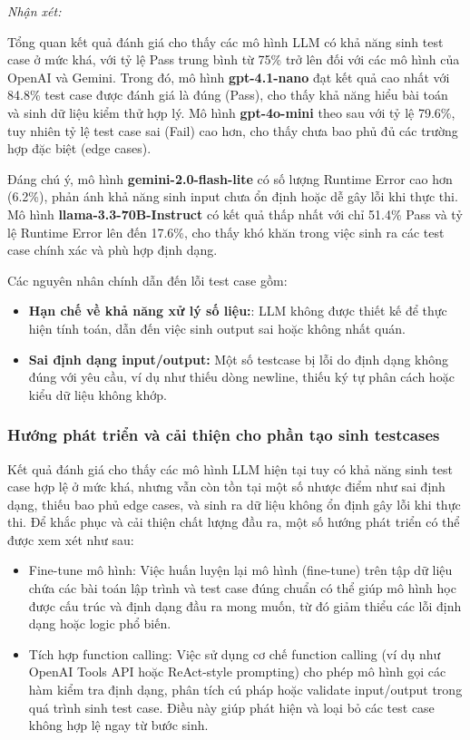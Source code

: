 \emph{Nhận xét: }

Tổng quan kết quả đánh giá cho thấy các mô hình LLM có khả năng sinh test case ở mức khá, với tỷ lệ Pass trung bình từ 75\% trở lên đối với các mô hình của OpenAI và Gemini. Trong đó, mô hình \textbf{gpt-4.1-nano} đạt kết quả cao nhất với 84.8\% test case được đánh giá là đúng (Pass), cho thấy khả năng hiểu bài toán và sinh dữ liệu kiểm thử hợp lý. Mô hình \textbf{gpt-4o-mini} theo sau với tỷ lệ 79.6\%, tuy nhiên tỷ lệ test case sai (Fail) cao hơn, cho thấy chưa bao phủ đủ các trường hợp đặc biệt (edge cases).

Đáng chú ý, mô hình \textbf{gemini-2.0-flash-lite} có số lượng Runtime Error cao hơn (6.2\%), phản ánh khả năng sinh input chưa ổn định hoặc dễ gây lỗi khi thực thi. Mô hình \textbf{llama-3.3-70B-Instruct} có kết quả thấp nhất với chỉ 51.4\% Pass và tỷ lệ Runtime Error lên đến 17.6\%, cho thấy khó khăn trong việc sinh ra các test case chính xác và phù hợp định dạng.

Các nguyên nhân chính dẫn đến lỗi test case gồm:
\begin{itemize}
    \item \textbf{Hạn chế về khả năng xử lý số liệu:}: LLM không được thiết kế để thực hiện tính toán, dẫn đến việc sinh output sai hoặc không nhất quán.
    \item \textbf{Sai định dạng input/output:} Một số testcase bị lỗi do định dạng không đúng với yêu cầu, ví dụ như thiếu dòng newline, thiếu ký tự phân cách hoặc kiểu dữ liệu không khớp.
\end{itemize}
\subsubsection{Hướng phát triển và cải thiện cho phần tạo sinh testcases}

Kết quả đánh giá cho thấy các mô hình LLM hiện tại tuy có khả năng sinh test case hợp lệ ở mức khá, nhưng vẫn còn tồn tại một số nhược điểm như sai định dạng, thiếu bao phủ edge cases, và sinh ra dữ liệu không ổn định gây lỗi khi thực thi. Để khắc phục và cải thiện chất lượng đầu ra, một số hướng phát triển có thể được xem xét như sau:

\begin{itemize}
    \item Fine-tune mô hình: Việc huấn luyện lại mô hình (fine-tune) trên tập dữ liệu chứa các bài toán lập trình và test case đúng chuẩn có thể giúp mô hình học được cấu trúc và định dạng đầu ra mong muốn, từ đó giảm thiểu các lỗi định dạng hoặc logic phổ biến.

    \item Tích hợp function calling: Việc sử dụng cơ chế function calling (ví dụ như OpenAI Tools API hoặc ReAct-style prompting) cho phép mô hình gọi các hàm kiểm tra định dạng, phân tích cú pháp hoặc validate input/output trong quá trình sinh test case. Điều này giúp phát hiện và loại bỏ các test case không hợp lệ ngay từ bước sinh.
\end{itemize}
